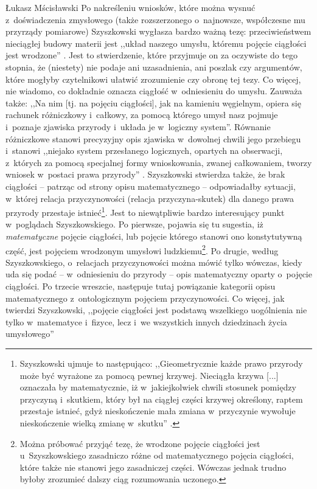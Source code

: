 \begin{artplenv}{Łukasz Mścisławski}
Po nakreśleniu wniosków, które można wysnuć z~doświadczenia zmysłowego (także rozszerzonego o~najnowsze, współczesne mu przyrządy pomiarowe) Szyszkowski wygłasza bardzo ważną tezę: przeciwieństwem nieciągłej budowy materii jest ,,układ naszego umysłu, któremu pojęcie ciągłości jest wrodzone''
\parencite[][s.~47]{szyszkowski_o_1916}. %
 Jest to stwierdzenie, które przyjmuje on za oczywiste do tego stopnia, że (niestety) nie podaje ani uzasadnienia, ani poszlak czy argumentów, które mogłyby czytelnikowi ułatwić zrozumienie czy obronę tej tezy. Co więcej, nie wiadomo, co dokładnie oznacza ciągłość w~odniesieniu do umysłu. Zauważa także: ,,Na nim [tj. na pojęciu ciągłości], jak na kamieniu węgielnym, opiera się rachunek różniczkowy i~całkowy, za pomocą którego umysł nasz pojmuje i~poznaje zjawiska przyrody i~układa je w~logiczny system''. Równanie różniczkowe stanowi precyzyjny opis zjawiska w~dowolnej chwili jego przebiegu i~stanowi ,,niejako system przesłanego logicznych, opartych na obserwacji, z~których za pomocą specjalnej formy wnioskowania, zwanej całkowaniem, tworzy wniosek w~postaci prawa przyrody'' 
\parencite[][s.~47]{szyszkowski_o_1916}. %
 Szyszkowski stwierdza także, że brak ciągłości -- patrząc od strony opisu matematycznego -- odpowiadałby sytuacji, w~której relacja przyczynowości (relacja przyczyna-skutek) dla danego prawa przyrody przestaje istnieć\footnote{Szyszkowski ujmuje to następująco: ,,Gieometrycznie każde prawo przyrody może być wyrażone za pomocą pewnej krzywej. Nieciągła krzywa [...] oznaczała by matematycznie, iż w~jakiejkolwiek chwili stosunek pomiędzy przyczyną i~skutkiem, który był na ciągłej części krzywej określony, raptem przestaje istnieć, gdyż nieskończenie mała zmiana w~przyczynie wywołuje nieskończenie wielką zmianę w~skutku'' 
\parencite[][s.~47]{szyszkowski_o_1916}.%
}. Jest to niewątpliwie bardzo interesujący punkt w~poglądach Szyszkowskiego. Po pierwsze, pojawia się tu sugestia, iż \textit{matematyczne} pojęcie ciągłości, lub pojęcie którego stanowi ono konstytutywną część, jest pojęciem wrodzonym umysłowi ludzkiemu\footnote{Można próbować przyjąć tezę, że wrodzone pojęcie ciągłości jest u~Szyszkowskiego zasadniczo różne od matematycznego pojęcia ciągłości, które także nie stanowi jego zasadniczej części. Wówczas jednak trudno byłoby zrozumieć dalszy ciąg rozumowania uczonego.}. Po drugie, według Szyszkowskiego, o~relacjach przyczynowości można mówić tylko wówczas, kiedy uda się podać -- w~odniesieniu do przyrody -- opis matematyczny oparty o~pojęcie ciągłości. Po trzecie wreszcie, następuje tutaj powiązanie kategorii opisu matematycznego z~ontologicznym pojęciem przyczynowości. Co więcej, jak twierdzi Szyszkowski, ,,pojęcie ciągłości jest podstawą wszelkiego uogólnienia nie tylko w~matematyce i~fizyce, lecz i~we wszystkich innych dziedzinach życia umysłowego'' 

\end{artplenv}

